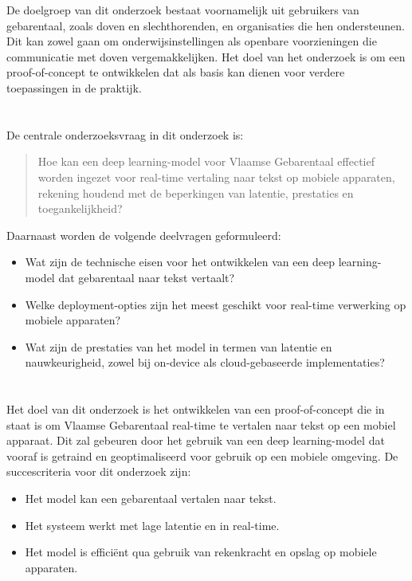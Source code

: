 De doelgroep van dit onderzoek bestaat voornamelijk uit gebruikers van gebarentaal, zoals doven en slechthorenden, en organisaties die hen ondersteunen. 
Dit kan zowel gaan om onderwijsinstellingen als openbare voorzieningen die communicatie met doven vergemakkelijken. 
Het doel van het onderzoek is om een proof-of-concept te ontwikkelen dat als basis kan dienen voor verdere toepassingen in de praktijk.

\section{}%
\label{sec:onderzoeksvraag}

De centrale onderzoeksvraag in dit onderzoek is:
\begin{quote}
    Hoe kan een deep learning-model voor Vlaamse Gebarentaal effectief worden ingezet voor real-time vertaling naar tekst op mobiele apparaten, rekening houdend met de beperkingen van latentie, prestaties en toegankelijkheid?
\end{quote}

Daarnaast worden de volgende deelvragen geformuleerd:
\begin{itemize}
  \item Wat zijn de technische eisen voor het ontwikkelen van een deep learning-model dat gebarentaal naar tekst vertaalt?
  \item Welke deployment-opties zijn het meest geschikt voor real-time verwerking op mobiele apparaten?
  \item Wat zijn de prestaties van het model in termen van latentie en nauwkeurigheid, zowel bij on-device als cloud-gebaseerde implementaties?
\end{itemize}

\section{}
\label{sec:onderzoeksdoelstelling}

Het doel van dit onderzoek is het ontwikkelen van een proof-of-concept die in staat is om Vlaamse Gebarentaal real-time te vertalen naar tekst op een mobiel apparaat. 
Dit zal gebeuren door het gebruik van een deep learning-model dat vooraf is getraind en geoptimaliseerd voor gebruik op een mobiele omgeving. 
De succescriteria voor dit onderzoek zijn:
\begin{itemize}
  \item Het model kan een gebarentaal vertalen naar tekst.
  \item Het systeem werkt met lage latentie en in real-time.
  \item Het model is efficiënt qua gebruik van rekenkracht en opslag op mobiele apparaten.
\end{itemize}

